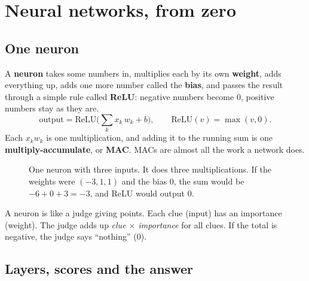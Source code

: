 \section{Neural networks, from zero}\label{sec:nn}

\subsection{One neuron}

A \textbf{neuron} takes some numbers in, multiplies each by its own \textbf{weight}, adds everything
up, adds one more number called the \textbf{bias}, and passes the result through a simple rule
called \textbf{ReLU}: negative numbers become 0, positive numbers stay as they are.
\[
  \text{output} = \text{ReLU}\Big(\sum_k x_k\,w_k + b\Big),\qquad \text{ReLU}(v) = \max(v, 0).
\]
Each $x_k w_k$ is one multiplication, and adding it to the running sum is one
\textbf{multiply-accumulate}, or \textbf{MAC}. MACs are almost all the work a network does.

\begin{figure}[H]
\centering
{}
\caption{One neuron with three inputs. It does three multiplications. If the weights were
$(-3,1,1)$ and the bias 0, the sum would be $-6+0+3=-3$, and ReLU would output 0.}
\end{figure}

\begin{kid}
A neuron is like a judge giving points. Each clue (input) has an importance (weight). The judge adds
up \emph{clue $\times$ importance} for all clues. If the total is negative, the judge says ``nothing'' (0).
\end{kid}

\subsection{Layers, scores and the answer}


